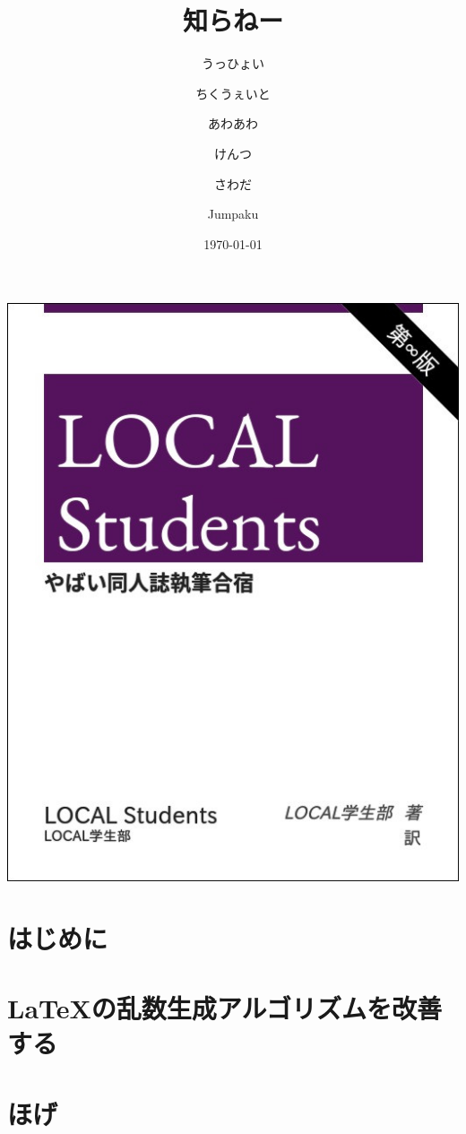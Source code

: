 \documentclass[autodetect-engine,dvipdfmx-if-dvi,ja=standard,a4paper,12pt,twoside,openany,layout=v2]{bxjsbook}
\title{知らねー}
\author{うっひょい \and ちくうぇいと \and あわあわ \and けんつ \and さわだ \and Jumpaku}
\date{\today}
\begin{document}
\begin{titlepage}
  \includegraphics{main.jpg}
\end{titlepage}
\maketitle
\frontmatter
\chapter{はじめに}


\tableofcontents
\mainmatter
{}
\chapter{\LaTeX の乱数生成アルゴリズムを改善する}


\chapter{ほげ}

\end{document}
